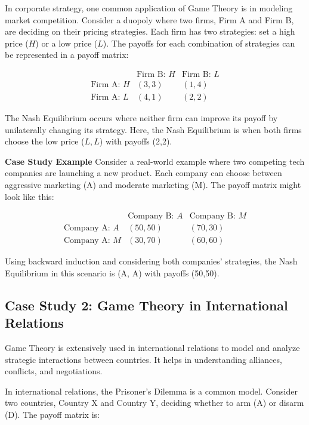 \documentclass[12pt]{book} %
\begin{document}
In corporate strategy, one common application of Game Theory is in modeling market competition. Consider a duopoly where two firms, Firm A and Firm B, are deciding on their pricing strategies. Each firm has two strategies: set a high price ($H$) or a low price ($L$). The payoffs for each combination of strategies can be represented in a payoff matrix:

\begin{equation}
\begin{array}{c|cc}
 & \text{Firm B: } H & \text{Firm B: } L \\
\hline
\text{Firm A: } H & (3,3) & (1,4) \\
\text{Firm A: } L & (4,1) & (2,2)
\end{array}
\end{equation}

The Nash Equilibrium occurs where neither firm can improve its payoff by unilaterally changing its strategy. Here, the Nash Equilibrium is when both firms choose the low price ($L, L$) with payoffs (2,2).

\textbf{Case Study Example}
Consider a real-world example where two competing tech companies are launching a new product. Each company can choose between aggressive marketing (A) and moderate marketing (M). The payoff matrix might look like this:

\begin{equation}
\begin{array}{c|cc}
 & \text{Company B: } A & \text{Company B: } M \\
\hline
\text{Company A: } A & (50,50) & (70,30) \\
\text{Company A: } M & (30,70) & (60,60)
\end{array}
\end{equation}

Using backward induction and considering both companies' strategies, the Nash Equilibrium in this scenario is (A, A) with payoffs (50,50).

\subsection{Case Study 2: Game Theory in International Relations}
Game Theory is extensively used in international relations to model and analyze strategic interactions between countries. It helps in understanding alliances, conflicts, and negotiations.

In international relations, the Prisoner's Dilemma is a common model. Consider two countries, Country X and Country Y, deciding whether to arm (A) or disarm (D). The payoff matrix is:
\end{document}
